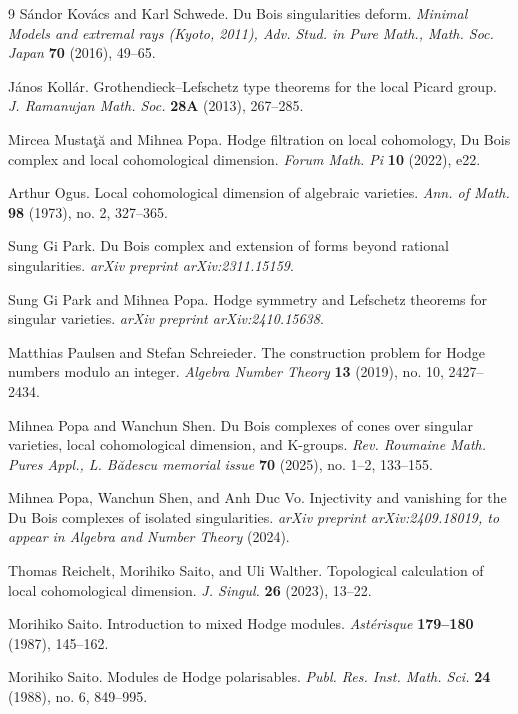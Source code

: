 \documentclass[11pt]{amsart}
\theoremstyle{definition}
\theoremstyle{plain}
\newcounter{intro}
\begin{document}
\begin{thebibliography}{9}
S{\'a}ndor Kov{\'a}cs and Karl Schwede. Du Bois singularities deform. \emph{Minimal Models and extremal rays (Kyoto, 2011), Adv. Stud. in Pure Math., Math. Soc. Japan} {\bf 70} (2016), 49--65.

J{\'a}nos Koll{\'a}r. Grothendieck--Lefschetz type theorems for the local Picard group. \emph{J. Ramanujan Math. Soc.} {\bf 28A} (2013), 267--285.

Mircea Musta{\c{t}}{\u{a}} and Mihnea Popa. Hodge filtration on local cohomology, Du Bois complex and local cohomological dimension. \emph{Forum Math. Pi} {\bf 10} (2022), e22.

Arthur Ogus. Local cohomological dimension of algebraic varieties. \emph{Ann. of Math.} {\bf 98} (1973), no. 2, 327--365.

Sung Gi Park. Du Bois complex and extension of forms beyond rational singularities. \emph{arXiv preprint arXiv:2311.15159}.

Sung Gi Park and Mihnea Popa. Hodge symmetry and Lefschetz theorems for singular varieties. \emph{arXiv preprint arXiv:2410.15638}.

Matthias Paulsen and Stefan Schreieder. The construction problem for Hodge numbers modulo an integer. \emph{Algebra Number Theory} {\bf 13} (2019), no. 10, 2427--2434.

Mihnea Popa and Wanchun Shen. Du Bois complexes of cones over singular varieties, local cohomological dimension, and K-groups. \emph{Rev. Roumaine Math. Pures Appl., L. B\u{a}descu memorial issue} {\bf 70} (2025), no. 1--2, 133--155.

Mihnea Popa, Wanchun Shen, and Anh Duc Vo. Injectivity and vanishing for the Du Bois complexes of isolated singularities. \emph{arXiv preprint arXiv:2409.18019, to appear in Algebra and Number Theory} (2024).

Thomas Reichelt, Morihiko Saito, and Uli Walther. Topological calculation of local cohomological dimension. \emph{J. Singul.} {\bf 26} (2023), 13--22.

Morihiko Saito. Introduction to mixed Hodge modules. \emph{Astérisque} {\bf 179--180} (1987), 145--162.

Morihiko Saito. Modules de Hodge polarisables. \emph{Publ. Res. Inst. Math. Sci.} {\bf 24} (1988), no. 6, 849--995.


\end{thebibliography}
\end{document}
